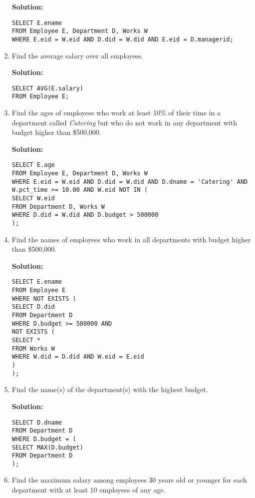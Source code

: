\begin{enumerate}
\textbf{Solution:}
  
\begin{verbatim}
SELECT E.ename
FROM Employee E, Department D, Works W
WHERE E.eid = W.eid AND D.did = W.did AND E.eid = D.managerid;
\end{verbatim}
 
\item Find the average salary over all employees. 
  
\textbf{Solution:}
  
\begin{verbatim}
SELECT AVG(E.salary)
FROM Employee E;
\end{verbatim}
  
\item Find the ages of employees who work at least 10\% of their time in a department called \textit{Catering} but who do not work in any department with budget higher than \$500,000.
  
\textbf{Solution:}
  
\begin{verbatim}
SELECT E.age
FROM Employee E, Department D, Works W
WHERE E.eid = W.eid AND D.did = W.did AND D.dname = 'Catering' AND W.pct_time >= 10.00 AND W.eid NOT IN (
SELECT W.eid
FROM Department D, Works W
WHERE D.did = W.did AND D.budget > 500000
);
\end{verbatim}
  
\item Find the names of employees who work in all departments with budget higher than \$500,000. 
  
\textbf{Solution:}
  
\begin{verbatim}
SELECT E.ename
FROM Employee E
WHERE NOT EXISTS (
SELECT D.did
FROM Department D
WHERE D.budget >= 500000 AND
NOT EXISTS (
SELECT *
FROM Works W
WHERE W.did = D.did AND W.eid = E.eid
)
);
\end{verbatim}
  
\item Find the name(s) of the department(s) with the highest budget.
  
\textbf{Solution:}
  
\begin{verbatim}
SELECT D.dname
FROM Department D
WHERE D.budget = (
SELECT MAX(D.budget)
FROM Department D
);
\end{verbatim}
  
\item Find the maximum salary among employees 30 years old or younger for each department with at least 10 employees of any age.
  

\end{enumerate}
